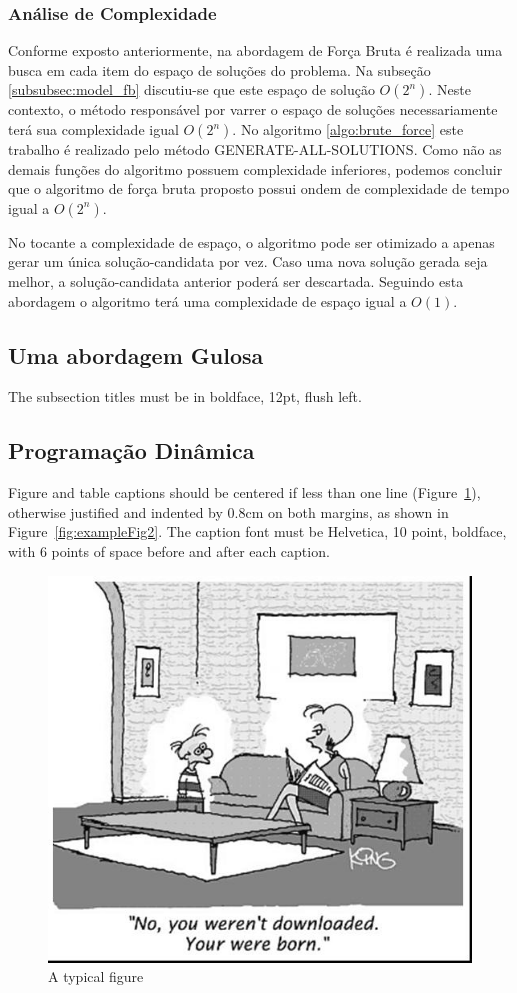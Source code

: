 \documentclass[12pt]{article}
\begin{document}
\subsubsection{Análise de Complexidade}
\label{subsubsec:fb_analise_complexidade}

Conforme exposto anteriormente, na abordagem de Força Bruta é realizada uma busca em cada item do espaço de soluções do problema. Na subseção \ref{subsubsec:model_fb} discutiu-se que este espaço de solução $O(2^{n})$. Neste contexto, o método responsável por varrer o espaço de soluções necessariamente terá sua complexidade igual $O(2^{n})$. No algoritmo \ref{algo:brute_force} este trabalho é realizado pelo método \textsc{GENERATE-ALL-SOLUTIONS}{}. Como não as demais funções do algoritmo possuem complexidade inferiores, podemos concluir que o algoritmo de força bruta proposto possui ondem de complexidade de tempo igual a $O(2^{n})$.

No tocante a complexidade de espaço, o algoritmo pode ser otimizado a apenas gerar um única solução-candidata por vez. Caso uma nova solução gerada seja melhor, a solução-candidata anterior poderá ser descartada. Seguindo esta abordagem o algoritmo terá uma complexidade de espaço igual a $O(1)${}.

\subsection{Uma abordagem Gulosa}
\label{subsec:guloso}

The subsection titles must be in boldface, 12pt, flush left.

\subsection{Programação Dinâmica}
\label{subsec:pd}


Figure and table captions should be centered if less than one line
(Figure~\ref{fig:exampleFig1}), otherwise justified and indented by 0.8cm on
both margins, as shown in Figure~\ref{fig:exampleFig2}. The caption font must
be Helvetica, 10 point, boldface, with 6 points of space before and after each
caption.

\begin{figure}[ht]
\centering
\includegraphics[width=.5\textwidth]{fig1.jpg}
\caption{A typical figure}
\label{fig:exampleFig1}
\end{figure}
\end{document}
